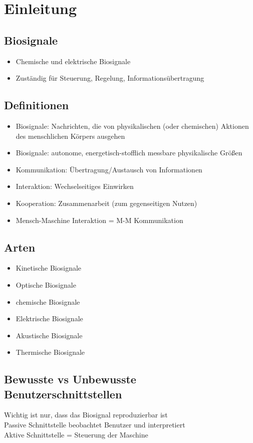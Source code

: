 \documentclass[a4paper,10pt,oneside]{article}
\begin{document}
\tableofcontents
 
\section{Einleitung}
\subsection{Biosignale}
\begin{itemize}
	\item Chemische und elektrische Biosignale
	\item Zuständig für Steuerung, Regelung, Informationsübertragung
\end{itemize}
\subsection{Definitionen}
\begin{itemize}
	\item Biosignale: Nachrichten, die von physikalischen (oder chemischen) Aktionen des menschlichen Körpers ausgehen
	\item Biosignale: autonome, energetisch-stofflich messbare physikalische Größen
	\item Kommunikation:  Übertragung/Austausch von Informationen
	\item Interaktion: Wechselseitiges Einwirken
	\item Kooperation: Zusammenarbeit (zum gegenseitigen Nutzen)
	\item Mensch-Maschine Interaktion = M-M Kommunikation
\end{itemize}

\subsection{Arten}
\begin{itemize}
	\item Kinetische Biosignale
	\item Optische Biosignale
	\item chemische Biosignale
	\item Elektrische Biosignale
	\item Akustische Biosignale
	\item Thermische Biosignale
\end{itemize}

\subsection{Bewusste vs Unbewusste Benutzerschnittstellen}
Wichtig ist nur, dass das Biosignal reproduzierbar ist \\
Passive Schnittstelle beobachtet Benutzer und interpretiert \\
Aktive Schnittstelle = Steuerung der Maschine
\end{document}
